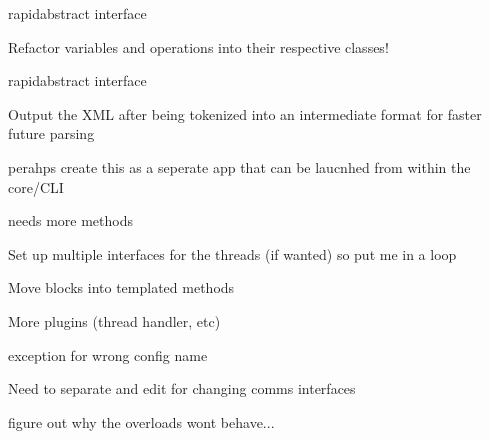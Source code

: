 \begin{DoxyRefList}
\label{todo__todo000027}%
%
rapidabstract interface 

\label{todo__todo000028}%
%
Refactor variables and operations into their respective classes! 

\label{todo__todo000031}%
%
rapidabstract interface  
\item[Module \mbox{\hyperlink{group__testCaseHandler}{Test\+Case\+Handler}} ]\label{todo__todo000032}%
%
Output the X\+ML after being tokenized into an intermediate format for faster future parsing

\label{todo__todo000033}%
%
perahps create this as a seperate app that can be laucnhed from within the core/\+C\+LI  
\item[Member \mbox{\hyperlink{classTestRunner_1_1TestRunner_a6d445a66f517e64d67f636d3bcab44c0}{Test\+Runner::Test\+Runner::Begin\+Testing}} ()]\label{todo__todo000034}%
%
needs more methods 

\label{todo__todo000035}%
%
Set up multiple interfaces for the threads (if wanted) so put me in a loop 

\label{todo__todo000036}%
%
Move blocks into templated methods 

\label{todo__todo000037}%
%
More plugins (thread handler, etc) 

\label{todo__todo000038}%
%
exception for wrong config name 

\label{todo__todo000039}%
%
Need to separate and edit for changing comms interfaces  
\item[Module \mbox{\hyperlink{group__utility}{utility}} ]\label{todo__todo000040}%
%
figure out why the overloads won\textquotesingle{}t behave... 
\end{DoxyRefList}